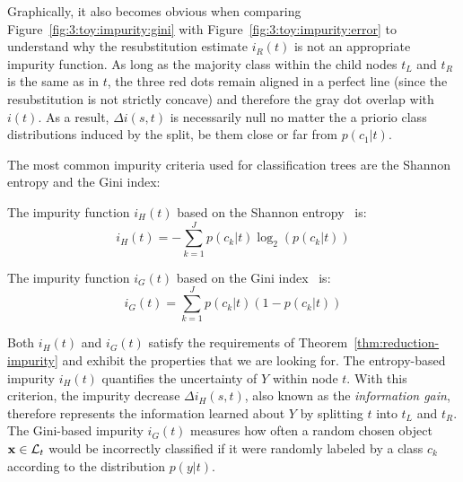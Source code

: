 Graphically, it also becomes obvious when comparing
Figure~\ref{fig:3:toy:impurity:gini} with Figure~\ref{fig:3:toy:impurity:error}
to understand why the resubstitution estimate $i_R(t)$ is not an appropriate impurity
function. As long as the majority class within the child nodes $t_L$ and $t_R$
is the same as in $t$, the three red dots remain aligned in a perfect line
(since the resubstitution is not strictly concave) and therefore the gray dot
overlap with $i(t)$. As a result, $\Delta i(s,t)$ is necessarily null no matter
the a priorio class distributions induced by the split, be them close or far
from $p(c_1|t)$.

The most common impurity criteria used for classification trees are the Shannon
entropy and the Gini index:

\begin{definition}
The impurity function $i_H(t)$ based on the Shannon entropy~\citep{shannon:1949} is:
\begin{equation}
i_H(t) = - \sum_{k=1}^J p(c_k|t) \log_2 (p(c_k|t))
\end{equation}
\end{definition}
\begin{definition}
The impurity function $i_G(t)$ based on the Gini index~\citep{gini:1912} is:
\begin{equation}
i_G(t) = \sum_{k=1}^J p(c_k|t) (1 - p(c_k|t))
\end{equation}
\end{definition}

Both $i_H(t)$ and $i_G(t)$ satisfy the requirements of Theorem~\ref{thm:reduction-impurity}
and exhibit the properties that we are looking
for. The entropy-based impurity $i_H(t)$ quantifies the uncertainty of $Y$
within node $t$. With this criterion, the impurity decrease $\Delta i_H(s,t)$,
also known as the \textit{information gain}, therefore represents the
information learned about $Y$ by splitting $t$ into $t_L$ and $t_R$. The Gini-based
impurity $i_G(t)$ measures how often a random chosen object $\mathbf{x}\in {\cal L}_t$
would be incorrectly classified if it were randomly labeled by a class $c_k$
according to the distribution $p(y|t)$.





